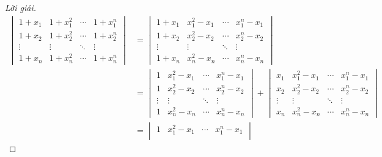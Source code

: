 \documentclass[class=nhvh-linear-algebra,crop=false]{standalone}
\begin{document}
\begin{proof}[Lời giải]
    \begingroup{}
    \allowdisplaybreaks{}
    \begin{align*}
        \begin{vmatrix}
            1 + x_{1} & 1 + x_{1}^{2} & \cdots & 1 + x_{1}^{n} \\
            1 + x_{2} & 1 + x_{2}^{2} & \cdots & 1 + x_{2}^{n} \\
            \vdots    & \vdots        & \ddots & \vdots        \\
            1 + x_{n} & 1 + x_{n}^{2} & \cdots & 1 + x_{n}^{n}
        \end{vmatrix}
         & =
        \begin{vmatrix}
            1 + x_{1} & x_{1}^{2} - x_{1} & \cdots & x_{1}^{n} - x_{1} \\
            1 + x_{2} & x_{2}^{2} - x_{2} & \cdots & x_{2}^{n} - x_{2} \\
            \vdots    & \vdots            & \ddots & \vdots            \\
            1 + x_{n} & x_{n}^{2} - x_{n} & \cdots & x_{n}^{n} - x_{n}
        \end{vmatrix}                                   \\
         & =
        \begin{vmatrix}
            1      & x_{1}^{2} - x_{1} & \cdots & x_{1}^{n} - x_{1} \\
            1      & x_{2}^{2} - x_{2} & \cdots & x_{2}^{n} - x_{2} \\
            \vdots & \vdots            & \ddots & \vdots            \\
            1      & x_{n}^{2} - x_{n} & \cdots & x_{n}^{n} - x_{n}
        \end{vmatrix}
        +
        \begin{vmatrix}
            x_{1}  & x_{1}^{2} - x_{1} & \cdots & x_{1}^{n} - x_{1} \\
            x_{2}  & x_{2}^{2} - x_{2} & \cdots & x_{2}^{n} - x_{2} \\
            \vdots & \vdots            & \ddots & \vdots            \\
            x_{n}  & x_{n}^{2} - x_{n} & \cdots & x_{n}^{n} - x_{n}
        \end{vmatrix}                                      \\
         & =
        \begin{vmatrix}
            1      & x_{1}^{2} - x_{1} & \cdots & x_{1}^{n} - x_{1} \\

\end{vmatrix}
\end{align*}
\end{proof}
\end{document}

